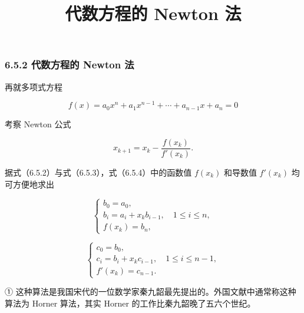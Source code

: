 \documentclass[
  10pt,
  fontset=fandol]{ctexart}
\title{代数方程的 Newton 法}
\author{}
\date{}
\begin{document}
\maketitle

\subsubsection{6.5.2 代数方程的 Newton 法}\label{ux4ee3ux6570ux65b9ux7a0bux7684-newton-ux6cd5}

再就多项式方程

\[
f(x)=a_0x^n+a_1x^{n-1}+\cdots+a_{n-1}x+a_n=0
\]

考察 Newton 公式

\[
x_{k+1}=x_k-\frac{f(x_k)}{f'(x_k)}.
\tag{6.5.4}
\]

据式（6.5.2）与式（6.5.3），式（6.5.4）中的函数值 \(f(x_k)\) 和导数值 \(f'(x_k)\) 均可方便地求出

\[
\begin{cases}
b_0=a_0,\\
b_i=a_i+x_kb_{i-1},\quad1\leqslant i\leqslant n,\\
f(x_k)=b_n,
\end{cases}
\tag{6.5.5}
\]

\[
\begin{cases}
c_0=b_0,\\
c_i=b_i+x_kc_{i-1},\quad1\leqslant i\leqslant n-1,\\
f'(x_k)=c_{n-1}.
\end{cases}
\tag{6.5.6}
\]

① 这种算法是我国宋代的一位数学家秦九韶最先提出的。外国文献中通常称这种算法为 Horner 算法，其实 Horner 的工作比秦九韶晚了五六个世纪。
\end{document}
